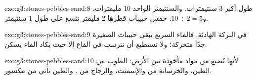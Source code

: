 \begin{solution}{exo:g3:stones-pebbles-sand:8}
طول أكبر  3 سنتيمترات. والسنتيمتر الواحد 10
مليمترات، و$10 \div 2 = 5$: خمس حبيبات قطرها 2 مليمتر تتسع على طول
1 سنتيمتر.
\end{solution}

\begin{solution}{exo:g3:stones-pebbles-sand:9}
في البركة الهادئة. فالماء السريع يبقي حبيبات  الصغيرة جدًا متحركة؛
ولا تستطيع أن تترسب في القاع إلا حيث يكاد الماء يسكن.
\end{solution}

\begin{solution}{exo:g3:stones-pebbles-sand:10}
لأنها تُصنع من مواد مأخوذة من الأرض: الطوب من الطين، والخرسانة من 
 والإسمنت، والزجاج من . والطين   تأتي من 
مكسور.
\end{solution}
